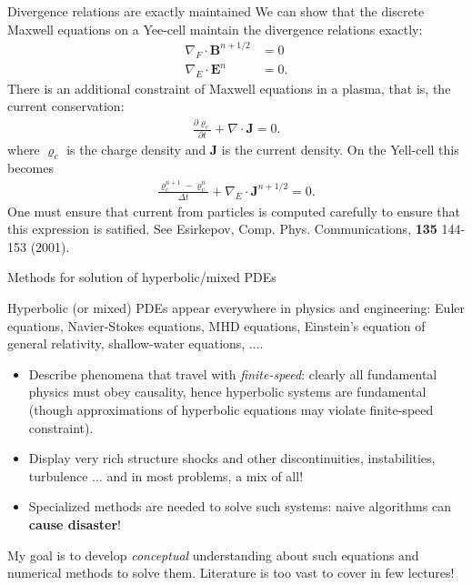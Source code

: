 \documentclass[aspectratio=169]{beamer}
\newcommand{\mypause}{}
\newcommand{\pfrac}[2]{\frac{\partial #1}{\partial #2}}
\newcommand{\mvec}[1]{\mathbf{#1}}
\theoremstyle{definition}
\begin{document}
\begin{frame}{Divergence relations are exactly maintained}
  \small%
  We can show that the discrete Maxwell equations on a Yee-cell
  maintain the divergence relations exactly:
  \begin{align*}
    \nabla_F\cdot\mvec{B}^{n+1/2} &= 0 \\
    \nabla_E\cdot\mvec{E}^n &= 0.
  \end{align*}
  There is an additional constraint of Maxwell equations in a plasma,
  that is, the current conservation:
  \begin{align*}
    \pfrac{\varrho_c}{t} + \nabla\cdot\mvec{J} = 0.
  \end{align*}
  where $\varrho_c$ is the charge density and $\mvec{J}$ is the
  current density. On the Yell-cell this becomes
  \begin{align*}
    \frac{\varrho_c^{n+1}-\varrho_v^{n}}{\Delta t}
    +
    \nabla_E\cdot\mvec{J}^{n+1/2} = 0.    
  \end{align*}
  One must ensure that current from particles is computed carefully to
  ensure that this expression is satified. See Esirkepov,
  Comp. Phys. Communications, {\bf 135} 144-153 (2001).
\end{frame}

\begin{frame}{Methods for solution of hyperbolic/mixed PDEs}

  Hyperbolic (or mixed) PDEs appear everywhere in physics and
  engineering: Euler equations, Navier-Stokes equations, MHD
  equations, Einstein's equation of general relativity, shallow-water
  equations, ....%
  \mypause%
  \begin{itemize}
  \item Describe phenomena that travel with \emph{finite-speed}:
    clearly all fundamental physics must obey causality, hence
    hyperbolic systems are fundamental (though approximations of
    hyperbolic equations may violate finite-speed constraint).
    \mypause%
  \item Display very rich structure shocks and other discontinuities,
    instabilities, turbulence ... and in most problems, a mix of all!
    \mypause%
  \item Specialized methods are needed to solve such systems: naive
    algorithms can {\bf cause disaster}!
  \end{itemize}
  \mypause%
  My goal is to develop \emph{conceptual} understanding about such
  equations and numerical methods to solve them. Literature is too
  vast to cover in few lectures!

\end{frame}
\end{document}
